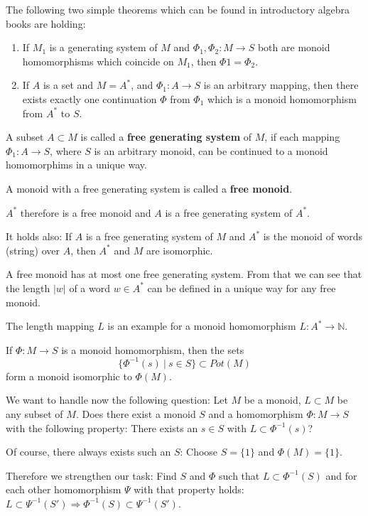 The following two simple theorems which can be found in introductory algebra
books are holding:
\begin{enumerate}
  \item If $M_1$ is a generating system of $M$ and $\Phi_1, \Phi_2 : M \to S$
  both are monoid homomorphisms which coincide on $M_1$, then $\Phi1 = \Phi_2$.
  \item If $A$ is a set and $M = A^*$, and $\Phi_1 : A \to S$ is an arbitrary
  mapping, then there exists exactly one continuation $\Phi$ from $\Phi_1$ which
  is a monoid homomorphism from $A^*$ to $S$.
\end{enumerate}

\begin{definition}
A subset $A \subset M$ is called a {\bf free generating system} of $M$, if each
mapping $\Phi_1 : A \to S$, where $S$ is an arbitrary monoid, can be continued
to a monoid homomorphims in a unique way.
\end{definition}

A monoid with a free generating system is called a {\bf free monoid}.

$A^*$ therefore is a free monoid and $A$ is a free generating system of $A^*$.

It holds also:
If $A$ is a free generating system of $M$ and $A^*$ is the monoid of words
(string) over $A$, then $A^*$ and $M$ are isomorphic.

A free monoid has at most one free generating system. From that we can see that
the length $|w|$ of a word $w \in A^*$ can be defined in a unique way for any
free monoid.

The length mapping $L$ is an example for a monoid homomorphism $L : A^* \to
\mathbb{N}$.

If $\Phi : M \to S$ is a monoid homomorphism, then the sets 
\[\{ \Phi^{-1}(s)\ |\ s \in S \} \subset Pot(M)\]
form a monoid isomorphic to $\Phi(M)$.

We want to handle now the following question: Let $M$ be a monoid, $L \subset M$
be any subset of $M$. Does there exist a monoid $S$ and a homomorphism $\Phi :
M \to S$ with the following property: There exists an $s \in S$ with $L \subset
\Phi^{-1}(s)$?

Of course, there always exists such an $S$: Choose $S = \{1\}$ and $\Phi(M) =
\{1\}$.

Therefore we strengthen our task: Find $S$ and $\Phi$ such that $L \subset
\Phi^{-1}(S)$ and for each other homomorphism $\Psi$ with that property holds:
$L \subset \Psi^{-1}(S') \Rightarrow \Phi^{-1}(S) \subset \Psi^{-1}(S')$.

